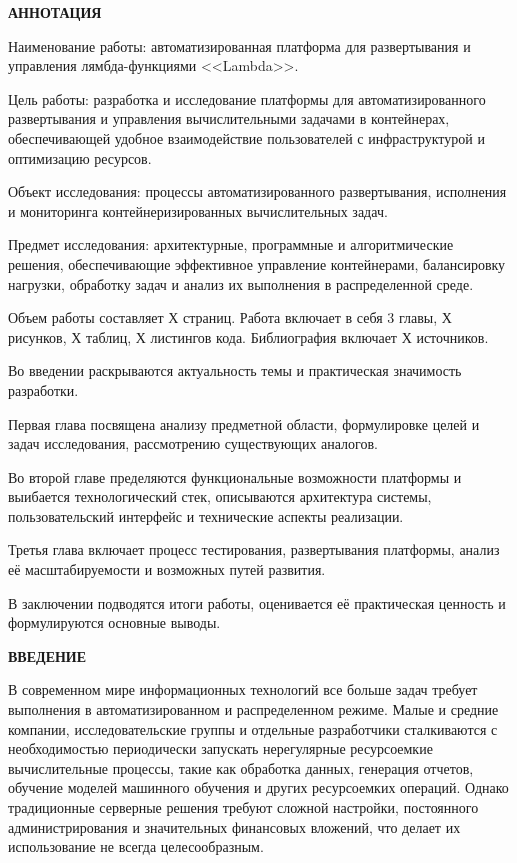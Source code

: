 \newpage
\begin{center}
  \textbf{\large АННОТАЦИЯ}
\end{center}

Наименование работы: автоматизированная платформа для развертывания и управления лямбда-функциями <<Lambda>>.

Цель работы: разработка и исследование платформы для автоматизированного развертывания и управления вычислительными задачами в контейнерах, обеспечивающей удобное взаимодействие пользователей с инфраструктурой и оптимизацию ресурсов.

Объект исследования: процессы автоматизированного развертывания, исполнения и мониторинга контейнеризированных вычислительных задач.

Предмет исследования: архитектурные, программные и алгоритмические решения, обеспечивающие эффективное управление контейнерами, балансировку нагрузки, обработку задач и анализ их выполнения в распределенной среде.

Объем работы составляет Х страниц. 
Работа включает в себя 3 главы, Х рисунков, Х таблиц, Х листингов кода.
Библиография включает Х источников.

Во введении раскрываются актуальность темы и практическая значимость разработки.

Первая глава посвящена анализу предметной области, формулировке целей и задач исследования, рассмотрению существующих аналогов.

Во второй главе пределяются функциональные возможности платформы и выибается технологический стек, описываются архитектура системы, пользовательский интерфейс и технические аспекты реализации.

Третья глава включает процесс тестирования, развертывания платформы, анализ её масштабируемости и возможных путей развития.

В заключении подводятся итоги работы, оценивается её практическая ценность и формулируются основные выводы.

\onehalfspacing
\setcounter{page}{6}

\newpage
\renewcommand{\contentsname}{\centerline{\large СОДЕРЖАНИЕ}}
\tableofcontents

\newpage
\begin{center}
  \textbf{\large ВВЕДЕНИЕ}
\end{center}

В современном мире информационных технологий все больше задач требует выполнения в автоматизированном и распределенном режиме.
Малые и средние компании, исследовательские группы и отдельные разработчики сталкиваются с необходимостью периодически запускать нерегулярные ресурсоемкие вычислительные процессы, такие как обработка данных, генерация отчетов, обучение моделей машинного обучения и других ресурсоемких операций.
Однако традиционные серверные решения требуют сложной настройки, постоянного администрирования и значительных финансовых вложений, что делает их использование не всегда целесообразным.

